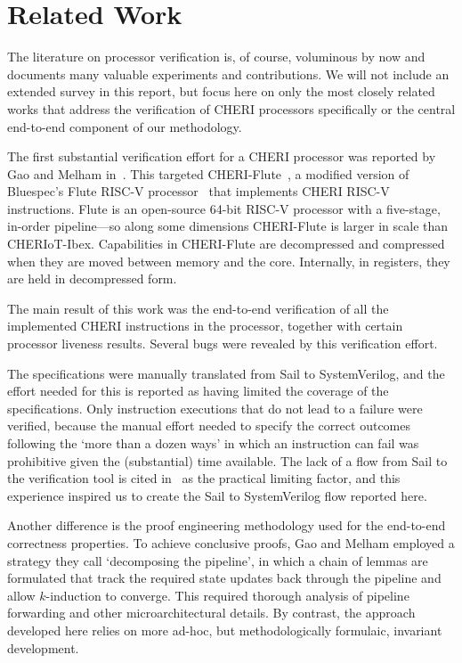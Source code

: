 \section{Related Work}
\label{sec:related}

The literature on processor verification is, of course, voluminous by now
and documents many valuable experiments and contributions. We will not
include an extended survey in this report, but focus here on only the most
closely related works that address the verification of CHERI processors
specifically or the central end-to-end component of our methodology.

The first substantial verification effort for a CHERI processor was
reported by Gao and Melham in~\cite{Gao:2021:EFV}. This targeted
CHERI-Flute~\cite{CTSRDCHERIFluteRISCV}, a modified version of Bluespec's
Flute RISC-V processor~\cite{Flute,FluteAnnouncement} that implements CHERI
RISC-V instructions. Flute is an open-source 64-bit RISC-V processor with a
five-stage, in-order pipeline---so along some dimensions CHERI-Flute is
larger in scale than CHERIoT-Ibex. Capabilities in CHERI-Flute are
decompressed and compressed when they are moved between memory and the
core. Internally, in registers, they are held in decompressed form.

The main result of this work was the end-to-end verification of all the
implemented CHERI instructions in the processor, together with certain
processor liveness results.  Several bugs were revealed by this
verification effort.

The specifications were manually translated from Sail to SystemVerilog, and
the effort needed for this is reported as having limited the coverage of
the specifications. Only instruction executions that do not lead to a
failure were verified, because the manual effort needed to specify the
correct outcomes following the `more than a dozen ways' in which an
instruction can fail was prohibitive given the (substantial) time available.
The lack of a flow from Sail to the verification tool is cited
in~\cite{Gao:2021:EFV} as the practical limiting factor, and this
experience inspired us to create the Sail to SystemVerilog flow reported
here.

Another difference is the proof engineering methodology used
for the end-to-end correctness properties. To achieve conclusive proofs,
Gao and Melham employed a strategy they call `decomposing the pipeline', in
which a chain of lemmas are formulated that track the required state
updates back through the pipeline and allow $k$-induction to converge. This
required thorough analysis of pipeline forwarding and other
microarchitectural details. By contrast, the approach developed here relies
on more ad-hoc, but methodologically formulaic, invariant
development.

